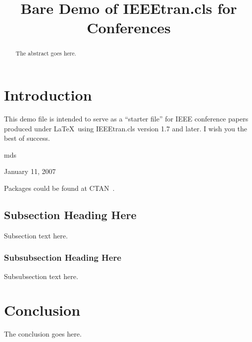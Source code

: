 \documentclass[conference]{IEEEtran}
\newcommand{\cameraready}[2]{#1} %
\begin{document}
%
\title{Bare Demo of IEEEtran.cls for Conferences}


\author{%
}

\maketitle


\begin{abstract}

The abstract goes here.
\end{abstract}

\cameraready{}{
\begin{IEEEkeywords}
blabla; dada; haha;
\end{IEEEkeywords}
}

\IEEEpeerreviewmaketitle



\section{Introduction}
This demo file is intended to serve as a ``starter file''
for IEEE conference papers produced under \LaTeX\ using
IEEEtran.cls version 1.7 and later.
I wish you the best of success.

\hfill mds
 
\hfill January 11, 2007

Packages could be found at CTAN~\cite{greenwade93}.
\subsection{Subsection Heading Here}
Subsection text here.


\subsubsection{Subsubsection Heading Here}
Subsubsection text here.


\section{Conclusion}
The conclusion goes here.

\cameraready{}{
\section*{Acknowledgment}
The authors would like to thank...
}

\balance



\end{document}

